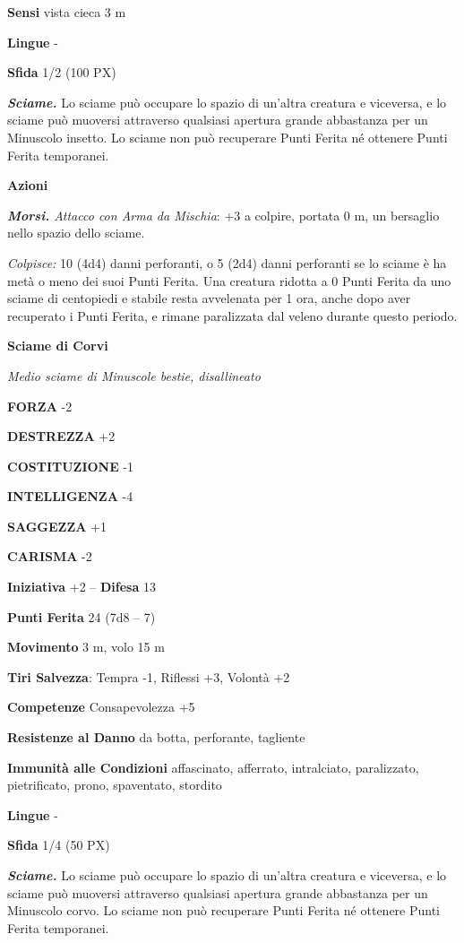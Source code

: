 \begin{multicols}{2}
\textbf{Sensi} vista cieca 3 m

\textbf{Lingue} -

\textbf{Sfida} 1/2 (100 PX)

\textit{\textbf{Sciame.}} Lo sciame può occupare lo spazio di un'altra creatura e viceversa, e lo sciame può muoversi attraverso qualsiasi apertura grande abbastanza per un Minuscolo insetto. Lo sciame non può recuperare Punti Ferita né ottenere Punti Ferita temporanei.

\textbf{Azioni}

\textit{\textbf{Morsi.} Attacco con Arma da Mischia}: +3 a colpire, portata 0 m, un bersaglio nello spazio dello sciame.

\textit{Colpisce:} 10 (4d4) danni perforanti, o 5 (2d4) danni perforanti se lo sciame è ha metà o meno dei suoi Punti Ferita. Una creatura ridotta a 0 Punti Ferita da uno sciame di centopiedi e stabile resta avvelenata per 1 ora, anche dopo aver recuperato i Punti Ferita, e rimane paralizzata dal veleno durante questo periodo.

\medskip\textbf{Sciame di Corvi}

\textit{Medio sciame di Minuscole bestie, disallineato}

\textbf{FORZA} -2

\textbf{DESTREZZA} +2

\textbf{COSTITUZIONE} -1

\textbf{INTELLIGENZA} -4

\textbf{SAGGEZZA} +1

\textbf{CARISMA} -2

\textbf{Iniziativa} +2 -- \textbf{Difesa} 13

\textbf{Punti Ferita} 24 (7d8 -- 7)

\textbf{Movimento} 3 m, volo 15 m

\textbf{Tiri Salvezza}: Tempra -1, Riflessi +3, Volontà +2

\textbf{Competenze} Consapevolezza +5

\textbf{Resistenze al Danno} da botta, perforante, tagliente

\textbf{Immunità alle Condizioni} affascinato, afferrato, intralciato, paralizzato, pietrificato, prono, spaventato, stordito

\textbf{Lingue} -

\textbf{Sfida} 1/4 (50 PX)

\textit{\textbf{Sciame.}} Lo sciame può occupare lo spazio di un'altra creatura e viceversa, e lo sciame può muoversi attraverso qualsiasi apertura grande abbastanza per un Minuscolo corvo. Lo sciame non può recuperare Punti Ferita né ottenere Punti Ferita temporanei.


\end{multicols}
